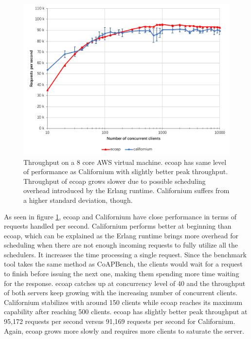 \begin{figure}[!htbp]
\centering
\includegraphics[scale = 0.8]{throughput}
\caption{Throughput on a 8 core AWS virtual machine. ecoap has same level of performance as Californium with slightly better peak throughput. Throughput of ecoap grows slower due to possible scheduling overhead introduced by the Erlang runtime. Californium suffers from a higher standard deviation, though.}
\label{fig:throughput}
\end{figure}

As seen in figure \ref{fig:throughput}, ecoap and Californium have close performance in terms of requests handled per second. Californium performs better at beginning than ecoap, which can be explained as the Erlang runtime brings more overhead for scheduling when there are not enough incoming requests to fully utilize all the schedulers. It increases the time processing a single request. Since the benchmark tool takes the same method as CoAPBench, the clients would wait for a request to finish before issuing the next one, making them spending more time waiting for the response. ecoap catches up at concurrency level of 40 and the throughput of both servers keep growing with the increasing number of concurrent clients. Californium stabilizes with around 150 clients while ecoap reaches its maximum capability after reaching 500 clients. ecoap has slightly better peak throughput at 95,172 requests per second versus 91,169 requests per second for Californium. Again, ecoap grows more slowly and requires more clients to saturate the server.

